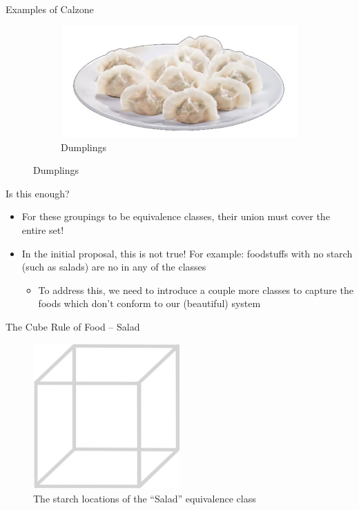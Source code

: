 \documentclass{beamer}
\begin{document}
\begin{frame}{Examples of Calzone}
\begin{figure}
\begin{subfigure}{.4\textwidth}
        \end{subfigure}%
        \begin{subfigure}{.4\textwidth}
          \centering
          \includegraphics[width=.8\linewidth]{calzone/28_dumplings.jpg}
          \caption{\label{fig:dumplings}Dumplings}
        \end{subfigure}
    \end{figure}
\end{frame}

\begin{frame}{Is this enough?}
    \begin{itemize}
        \item For these groupings to be equivalence classes, their union must cover the entire set!
        \item In the initial proposal, this is not true! For example: foodstuffs with no starch (such as salads) are no in any of the classes
        \begin{itemize}
            \item To address this, we need to introduce a couple more classes to capture the foods which don't conform to our (beautiful) system
        \end{itemize}
    \end{itemize}
\end{frame}

\begin{frame}{The Cube Rule of Food -- Salad}
    \begin{figure}
        \includegraphics[width=0.5\textwidth]{salad/29_salad.jpg}
        \caption{\label{fig:salad-diagram}The starch locations of the ``Salad'' equivalence class}
    \end{figure}
\end{frame}
\end{document}
